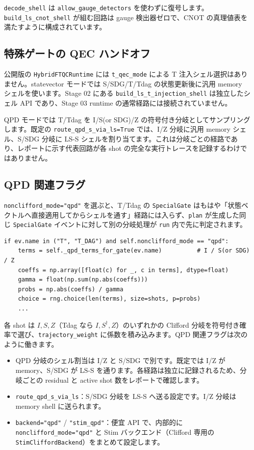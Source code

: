\texttt{decode\_shell} は \texttt{allow\_gauge\_detectors} を使わずに復号します。\texttt{build\_ls\_cnot\_shell} が組む回路は gauge 検出器ゼロで、CNOT の真理値表を満たすように構成されています。

\subsection{特殊ゲートの QEC ハンドオフ}

公開版の \texttt{HybridFTQCRuntime} には \texttt{t\_qec\_mode} による T 注入シェル選択はありません。statevector モードでは S/SDG/T/Tdag の状態更新後に汎用 memory シェルを使います。Stage 02 にある \texttt{build\_ls\_t\_injection\_shell} は独立したシェル API であり、Stage 03 runtime の通常経路には接続されていません。

QPD モードでは T/Tdag を I/S(or SDG)/Z の符号付き分岐としてサンプリングします。既定の \texttt{route\_qpd\_s\_via\_ls=True} では、I/Z 分岐に汎用 memory シェル、S/SDG 分岐に LS-S シェルを割り当てます。これは分岐ごとの経路であり、レポートに示す代表回路が各 shot の完全な実行トレースを記録するわけではありません。

\subsection{QPD 関連フラグ}

\texttt{nonclifford\_mode="qpd"} を選ぶと、T/Tdag の \texttt{SpecialGate} はもはや「状態ベクトルへ直接適用してからシェルを通す」経路には入らず、\texttt{plan} が生成した同じ \texttt{SpecialGate} イベントに対して別の分岐処理が \texttt{run} 内で先に判定されます。

\begin{lstlisting}[caption={QPD 分岐の生成（src/ftqc/hybrid\_ftqc\_runtime.py, run 内）}]
if ev.name in ("T", "T_DAG") and self.nonclifford_mode == "qpd":
    terms = self._qpd_terms_for_gate(ev.name)          # I / S(or SDG) / Z
    coeffs = np.array([float(c) for _, c in terms], dtype=float)
    gamma = float(np.sum(np.abs(coeffs)))
    probs = np.abs(coeffs) / gamma
    choice = rng.choice(len(terms), size=shots, p=probs)
    ...
\end{lstlisting}

各 shot は $I, S, Z$（Tdag なら $I, S^\dagger, Z$）のいずれかの Clifford 分岐を符号付き確率で選び、\texttt{trajectory\_weight} に係数を積み込みます。QPD 関連フラグは次のように働きます。

\begin{itemize}
  \item QPD 分岐のシェル割当は I/Z と S/SDG で別です。既定では I/Z が memory、S/SDG が LS-S を通ります。各経路は独立に記録されるため、分岐ごとの residual と active shot 数をレポートで確認します。
  \item \texttt{route\_qpd\_s\_via\_ls}：S/SDG 分岐を LS-S へ送る設定です。I/Z 分岐は memory shell に送られます。
  \item \texttt{backend="qpd"} / \texttt{"stim\_qpd"}：便宜 API で、内部的に \texttt{nonclifford\_mode="qpd"} と Stim バックエンド（Clifford 専用の \texttt{StimCliffordBackend}）をまとめて設定します。
\end{itemize}

